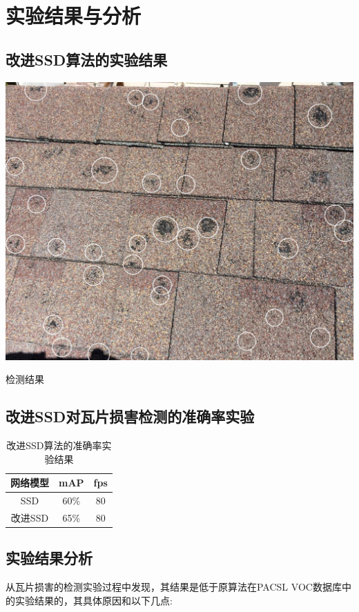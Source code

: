 \section{实验结果与分析}
\setcounter{figure}{0}

\subsection{改进SSD算法的实验结果}
\begin{uscfigure}
	\includegraphics[width=\textwidth]{./Pictures/result.jpg}	
	\caption{检测结果}
	\label{result}
\end{uscfigure}

\subsection{改进SSD对瓦片损害检测的准确率实验}
\begin{table}[htbp]
	\centering
	\caption{改进SSD算法的准确率实验结果}
	\label{}
	\begin{tabular}{ccc}
		\toprule
		网络模型 & mAP & fps\\
		\midrule
		SSD 	& 60\% & 80\\
		改进SSD  &  65\% & 80\\
		\bottomrule
	\end{tabular}
\end{table}
\subsection{实验结果分析}
从瓦片损害的检测实验过程中发现，其结果是低于原算法在PACSL VOC数据库中的实验结果的，其具体原因和以下几点:

